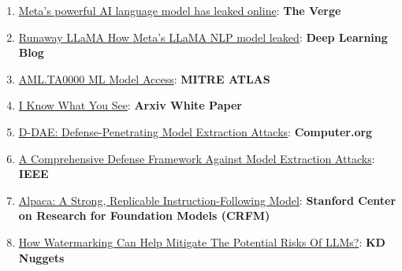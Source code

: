 \documentclass[
]{article}
\providecommand{\tightlist}{%
  \setlength{\itemsep}{0pt}\setlength{\parskip}{0pt}}
\begin{document}
\begin{enumerate}
\def\labelenumi{\arabic{enumi}.}
\tightlist
\item
  \href{https://www.theverge.com/2023/3/8/23629362/meta-ai-language-model-llama-leak-online-misuse}{Meta's
  powerful AI language model has leaked online}: \textbf{The Verge}
\item
  \href{https://www.deeplearning.ai/the-batch/how-metas-llama-nlp-model-leaked/}{Runaway
  LLaMA \textbar{} How Meta's LLaMA NLP model leaked}: \textbf{Deep
  Learning Blog}
\item
  \href{https://atlas.mitre.org/tactics/AML.TA0000}{AML.TA0000 ML Model
  Access}: \textbf{MITRE ATLAS}
\item
  \href{https://arxiv.org/pdf/1803.05847.pdf}{I Know What You See}:
  \textbf{Arxiv White Paper}
\item
  \href{https://www.computer.org/csdl/proceedings-article/sp/2023/933600a432/1He7YbsiH4c}{D-DAE:
  Defense-Penetrating Model Extraction Attacks}: \textbf{Computer.org}
\item
  \href{https://ieeexplore.ieee.org/document/10080996}{A Comprehensive
  Defense Framework Against Model Extraction Attacks}: \textbf{IEEE}
\item
  \href{https://crfm.stanford.edu/2023/03/13/alpaca.html}{Alpaca: A
  Strong, Replicable Instruction-Following Model}: \textbf{Stanford
  Center on Research for Foundation Models (CRFM)}
\item
  \href{https://www.kdnuggets.com/2023/03/watermarking-help-mitigate-potential-risks-llms.html}{How
  Watermarking Can Help Mitigate The Potential Risks Of LLMs?}:
  \textbf{KD Nuggets}
\end{enumerate}
\end{document}
